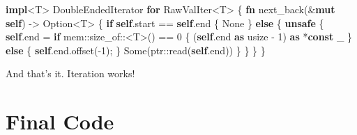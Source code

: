 \documentclass[a4paper,]{book}
\newenvironment{Shaded}{\begin{snugshade}}{\end{snugshade}}
\newcommand{\KeywordTok}[1]{\textcolor[rgb]{0.13,0.29,0.53}{\textbf{{#1}}}}
\newcommand{\DataTypeTok}[1]{\textcolor[rgb]{0.13,0.29,0.53}{{#1}}}
\newcommand{\DecValTok}[1]{\textcolor[rgb]{0.00,0.00,0.81}{{#1}}}
\newcommand{\ConstantTok}[1]{\textcolor[rgb]{0.00,0.00,0.00}{{#1}}}
\newcommand{\BuiltInTok}[1]{{#1}}
\newcommand{\NormalTok}[1]{{#1}}
\begin{document}
\begin{Shaded}
\begin{Highlighting}[]
\KeywordTok{impl}\NormalTok{<T> }\BuiltInTok{DoubleEndedIterator} \KeywordTok{for} \NormalTok{RawValIter<T> \{}
    \KeywordTok{fn} \NormalTok{next_back(&}\KeywordTok{mut} \KeywordTok{self}\NormalTok{) -> }\DataTypeTok{Option}\NormalTok{<T> \{}
        \KeywordTok{if} \KeywordTok{self}\NormalTok{.start == }\KeywordTok{self}\NormalTok{.end \{}
            \ConstantTok{None}
        \NormalTok{\} }\KeywordTok{else} \NormalTok{\{}
            \KeywordTok{unsafe} \NormalTok{\{}
                \KeywordTok{self}\NormalTok{.end = }\KeywordTok{if} \NormalTok{mem::size_of::<T>() == }\DecValTok{0} \NormalTok{\{}
                    \NormalTok{(}\KeywordTok{self}\NormalTok{.end }\KeywordTok{as} \DataTypeTok{usize} \NormalTok{- }\DecValTok{1}\NormalTok{) }\KeywordTok{as} \NormalTok{*}\KeywordTok{const} \NormalTok{_}
                \NormalTok{\} }\KeywordTok{else} \NormalTok{\{}
                    \KeywordTok{self}\NormalTok{.end.offset(-}\DecValTok{1}\NormalTok{);}
                \NormalTok{\}}
                \ConstantTok{Some}\NormalTok{(ptr::read(}\KeywordTok{self}\NormalTok{.end))}
            \NormalTok{\}}
        \NormalTok{\}}
    \NormalTok{\}}
\NormalTok{\}}
\end{Highlighting}
\end{Shaded}

And that's it. Iteration works!

\section{Final Code}\label{sec--vec-final}
\end{document}

